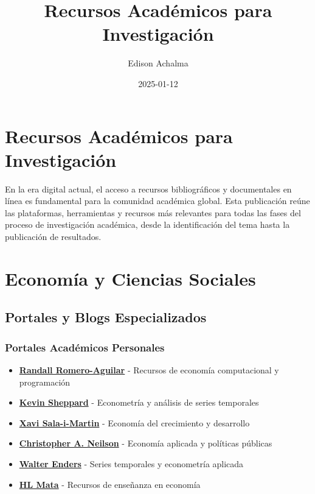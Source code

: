 \documentclass[
  jou,
  floatsintext,
  longtable,
  a4paper,
  nolmodern,
  notxfonts,
  notimes,
  12pt,
  colorlinks=true,linkcolor=blue,citecolor=blue,urlcolor=blue]{apa7}
\title{Recursos Académicos para Investigación}
\author{Edison Achalma}
\affiliation{
{Escuela Profesional de Economía, Universidad Nacional de San Cristóbal
de Huamanga}}
\date{2025-01-12}
\providecommand{\tightlist}{%
  \setlength{\itemsep}{0pt}\setlength{\parskip}{0pt}}
\begin{document}
\maketitle


\hypertarget{toc}{}
\tableofcontents
\newpage
\section[Introduction]{Recursos Académicos para Investigación}

\setcounter{secnumdepth}{3}

\setlength\LTleft{0pt}




En la era digital actual, el acceso a recursos bibliográficos y
documentales en línea es fundamental para la comunidad académica global.
Esta publicación reúne las plataformas, herramientas y recursos más
relevantes para todas las fases del proceso de investigación académica,
desde la identificación del tema hasta la publicación de resultados.

\section{Economía y Ciencias
Sociales}\label{economuxeda-y-ciencias-sociales}

\subsection{Portales y Blogs
Especializados}\label{portales-y-blogs-especializados}

\subsubsection{Portales Académicos
Personales}\label{portales-acaduxe9micos-personales}

\begin{itemize}
\tightlist
\item
  \textbf{\href{https://randall-romero.com/}{Randall Romero-Aguilar}} -
  Recursos de economía computacional y programación
\item
  \textbf{\href{https://www.kevinsheppard.com/}{Kevin Sheppard}} -
  Econometría y análisis de series temporales
\item
  \textbf{\href{https://www.salaimartin.com/}{Xavi Sala-i-Martin}} -
  Economía del crecimiento y desarrollo
\item
  \textbf{\href{https://christopherneilson.github.io/}{Christopher A.
  Neilson}} - Economía aplicada y políticas públicas
\item
  \textbf{\href{https://wenders.people.ua.edu/}{Walter Enders}} - Series
  temporales y econometría aplicada
\item
  \textbf{\href{http://webdelprofesor.ula.ve/economia/hmata/}{HL Mata}}
  - Recursos de enseñanza en economía
\end{itemize}
\end{document}
